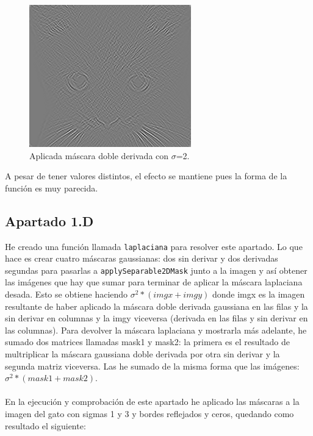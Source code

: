 \documentclass[12pt]{article}
\begin{document}
\begin{figure}[H]
\begin{minipage}{7cm}
\includegraphics[width=7cm]{images/GetDerivKernelsCatDobleDeriv.png}
\caption{Aplicada máscara doble derivada con $\sigma$=2.}
\label{fig:2figsB}
\end{minipage}
\end{figure}

A pesar de tener valores distintos, el efecto se mantiene pues la forma de la función es muy parecida.

\subsection*{Apartado 1.D}

He creado una función llamada \texttt{laplaciana} para resolver este apartado. Lo que hace es crear cuatro máscaras gaussianas: dos sin derivar y dos derivadas segundas para pasarlas a \texttt{applySeparable2DMask} junto a la imagen y así obtener las imágenes que hay que sumar para terminar de aplicar la máscara laplaciana desada. Esto se obtiene haciendo $\sigma^{2}*(imgx + imgy)$ donde imgx es la imagen resultante de haber aplicado la máscara doble derivada gaussiana en las filas y la sin derivar en columnas y la imgy viceversa (derivada en las filas y sin derivar en las columnas). Para devolver la máscara laplaciana y mostrarla más adelante, he sumado dos matrices llamadas mask1 y mask2: la primera es el resultado de multriplicar la máscara gaussiana doble derivada por otra sin derivar y la segunda matriz viceversa. Las he sumado de la misma forma que las imágenes: $\sigma^{2}*(mask1 + mask2)$.\\\\
En la ejecución y comprobación de este apartado he aplicado las máscaras a la imagen del gato con sigmas 1 y 3 y bordes reflejados y ceros, quedando como resultado el siguiente:
\end{document}

